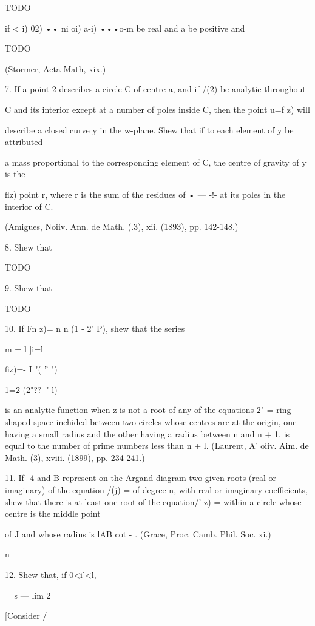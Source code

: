 TODO

if < i) 02) •• ni oi) a-i) •••o-m be real and a be positive and

TODO

(Stormer, Acta Math, xix.)

7. If a point 2 describes a circle C of centre a, and if /(2) be
analytic throughout

C and its interior except at a number of poles inside C, then the
point u=f z) will

describe a closed curve y in the w-plane. Shew that if to each element
of y be attributed

a mass proportional to the corresponding element of C, the centre of
gravity of y is the

flz) point r, where r is the sum of the residues of • — -!- at its
poles in the interior of C.

(Amigues, Noiiv. Ann. de Math. (.3), xii. (1893), pp. 142-148.)

8. Shew that

TODO

9. Shew that

TODO

%
%

10. If Fn z)= n n (1 - 2' P), shew that the series

m = l ]i=l

fiz)=- I "( '' ")

1=2 (2"??~"-l)%

is an analytic function when z is not a root of any of the equations
2" = %
ring-shaped space inchided between two circles whose centres are at
the origin, one having a small radius and the other having a radius
between n and n + 1, is equal to the number of prime numbers less than
n + l. (Laurent, A' oiiv. Aim. de Math. (3), xviii. (1899), pp.
234-241.)

11. If -4 and B represent on the Argand diagram two given roots (real
or imaginary) of the equation /(j) = of degree n, with real or
imaginary coefficients, shew that there is at least one root of the
equation/' z) = within a circle whose centre is the middle point

of J and whose radius is lAB cot - . (Grace, Proc. Camb. Phil. Soc.
xi.)

n

12. Shew that, if 0<i'<l,

= s — lim 2

[Consider /

